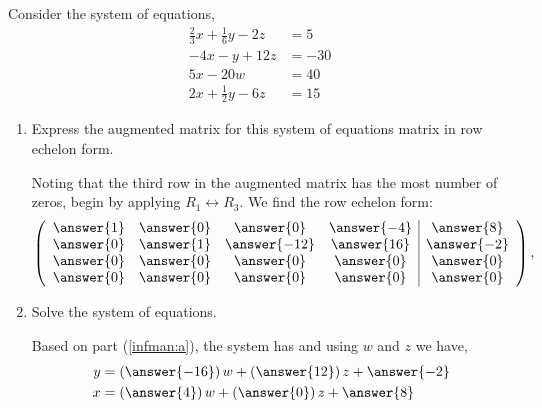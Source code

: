 \documentclass{ximera}
\author{Parisa Fatheddin}
\begin{document}
\begin{exercise} Consider the system of equations,
\begin{align*}
\frac{2}{3}x + \frac{1}{6}y -2z &= 5\\
-4x -y+12z &= -30\\
5x-20w &= 40\\
2x+\frac{1}{2} y - 6z &= 15
\end{align*}

\begin{enumerate}
\item\label{infman:a} Express the augmented matrix for this system of equations matrix
  in row echelon form.
\begin{prompt}
Noting that the third row in the augmented matrix has the most number
of zeros, begin by applying $R_{1}\leftrightarrow R_{3}$. We find the
row echelon form:
\[
\left(\begin{array}{cccc|c}
  \answer{1} &  \answer{0} & \answer{0} & \answer{-4} &\answer{8} \\
  \answer{0} &  \answer{1} & \answer{-12} & \answer{16} &\answer{-2}\\
  \answer{0} &  \answer{0} & \answer{0} & \answer{0} &\answer{0}\\
  \answer{0} &  \answer{0} & \answer{0} & \answer{0} &\answer{0}
\end{array}\right),
\]
\end{prompt}
\item Solve the system of equations.
\begin{prompt}
Based on part (\ref{infman:a}), the system has  and using $w$ and $z$ we have,
\begin{align*}
y &= \left(\answer{-16}\right)w + \left(\answer{12}\right)z + \answer{-2}\\
x&= \left(\answer{4}\right) w + \left(\answer{0}\right)z + \answer{8}
\end{align*}
\end{prompt}
\end{enumerate}
\end{exercise}
\end{document}
